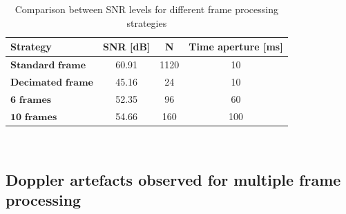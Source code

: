 		\begin{table}[H]
		    \centering 
		    \begin{tabular}{|p{9em} c c c |}
		    \hline
		    \rowcolor{bluepoli!40} %
		    \textbf{Strategy} & \textbf{SNR [dB]} & \textbf{N} & \textbf{Time aperture [ms]} \T\B \\
		    \hline \hline
		    $\textbf{Standard frame}$ & 60.91 & 1120 & 10 \T\B \\
		    $\textbf{Decimated frame}$ & 45.16 & 24 & 10 \T\B\\
		    $\textbf{6 frames}$ & 52.35 & 96 & 60  \T\B\\
		    $\textbf{10 frames}$ & 54.66 & 160 & 100  \T\B\\
		
		    \hline
		    \end{tabular}
		    \\[10pt]
		    \caption{Comparison between SNR levels for different frame processing strategies}
		    \label{table:TDDstratcomparison}
		\end{table}
		

	\subsection{Doppler artefacts observed for multiple frame processing}

